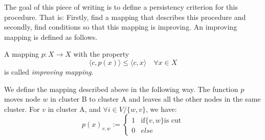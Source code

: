 The goal of this piece of writing is to define a persistency criterion for this procedure. That is: Firstly, find a mapping that describes this procedure and secondly, find conditions so that this mapping is improving. An improving mapping is defined as follows.
\begin{definition}
A mapping $p: X \rightarrow X$ with the property \[ \langle c, p(x) \rangle \leq \langle c, x \rangle \quad \forall x \in X \] is called \textit{improving mapping}.
\end{definition}
We define the mapping described above in the following way. The function $p$ moves node $w$ in cluster B to cluster A and leaves all the other nodes in the same cluster. For $v$ in cluster A, and $\forall i \in V/\{w, v\}$, we have:
\[ p(x)_{v,w}:=  \begin{cases}
1 & \text{if} \{v,w\} \text{is cut} \\
0 & else \end{cases} \]

